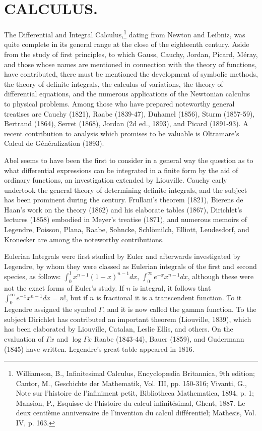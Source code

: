 \documentclass[oneside]{book}
\begin{document}
\chapter{CALCULUS.}

The Differential and Integral Calculus,\footnote{Williamson, B.,
Infinitesimal Calculus, Encyclop\ae{}dia Britannica, 9th edition;
Cantor, M., Geschichte der Mathematik, Vol. III, pp. 150-316;
Vivanti, G., Note sur l'histoire de l'infiniment petit, Bibliotheca
Mathematica, 1894, p. 1; Mansion, P., Esquisse de l'histoire du calcul
infinit\'esimal, Ghent, 1887. Le deux centi\`eme anniversaire
de l'invention du calcul diff\'erentiel; Mathesis, Vol. IV, p. 163.}
dating from Newton and Leibniz, was quite complete in its general
range at the close of the eighteenth century. Aside from the study
of first principles, to which Gauss, Cauchy, Jordan, Picard, M\'eray,
and those whose names are mentioned in connection with the theory of
functions, have contributed, there must be mentioned the development
of symbolic methods, the theory of definite integrals, the calculus
of variations, the theory of differential equations, and the
numerous applications of the Newtonian calculus to physical
problems. Among those who have prepared noteworthy general treatises
are Cauchy (1821), Raabe (1839-47), Duhamel (1856), Sturm (1857-59),
Bertrand (1864), Serret (1868), Jordan (2d ed., 1893), and Picard
(1891-93). A recent contribution to analysis which promises to be
valuable is Oltramare's Calcul de G\'en\'eralization (1893).

Abel seems to have been the first to consider in a general way the
question as to what differential expressions can be integrated in a
finite form by the aid of ordinary functions, an investigation
extended by Liouville. Cauchy early undertook the general theory of
determining definite integrals, and the subject has been prominent
during the century. Frullani's theorem (1821), Bierens de Haan's
work on the theory (1862) and his elaborate tables (1867),
Dirichlet's lectures (1858) embodied in Meyer's treatise (1871), and
numerous memoirs of Legendre, Poisson, Plana, Raabe, Sohncke,
Schl\"omilch, Elliott, Leudesdorf, and Kronecker are among the
noteworthy contributions.

Eulerian Integrals were first studied by Euler and afterwards
investigated by Legendre, by whom they were classed as Eulerian
integrals of the first and second species, as follows: $\int_0^1
x^{n-1}(1 - x)^{n-1}dx$, $\int_0^\infty e^{-x} x^{n-1}dx$, although
these were not the exact forms of Euler's study. If $n$ is
integral, it follows that $\int_0^\infty e^{-x}x^{n-1}dx = n!$, but
if $n$ is fractional it is a transcendent function. To it
Legendre assigned the symbol $\Gamma$, and it is now called the
gamma function. To the subject Dirichlet has contributed an
important theorem (Liouville, 1839), which has been elaborated by
Liouville, Catalan, Leslie Ellis, and others. On the evaluation of
$\Gamma x$ and $\log \Gamma x$ Raabe (1843-44), Bauer (1859), and
Gudermann (1845) have written. Legendre's great table appeared in
1816.
\end{document}
